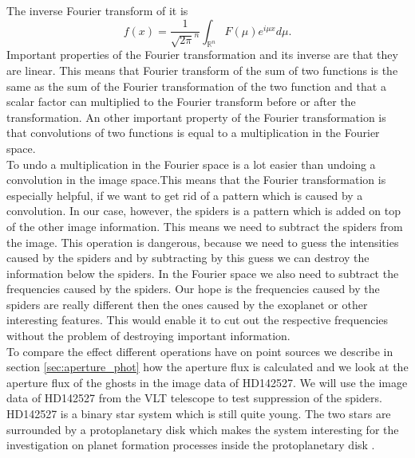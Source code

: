 The inverse Fourier transform of it is
\begin{equation}
	f(x) = \frac{1}{\sqrt{2\pi}^n} \int_{\mathbb{R}^n} F(\mu) e^{i\mu x} d\mu.
\end{equation}
Important properties of the Fourier transformation and its inverse are that they are linear. This means that Fourier transform of the sum of two functions is the same as the sum of the Fourier transformation of the two function and that a scalar factor can multiplied to the Fourier transform before or after the transformation. An other important property of the Fourier transformation is that convolutions of two functions is equal to a multiplication in the Fourier space. \\
To undo a multiplication in the Fourier space is a lot easier than undoing a convolution in the image space.This means that the Fourier transformation is especially helpful, if we want to get rid of a pattern which is caused by a convolution. In our case, however, the spiders is a pattern which is added on top of the other image information. This means we need to subtract the spiders from the image. This operation is dangerous, because we need to guess the intensities caused by the spiders and by subtracting by this guess we can destroy the information below the spiders. In the Fourier space we also need to subtract the frequencies caused by the spiders. Our hope is the frequencies caused by the spiders are really different then the ones caused by the exoplanet or other interesting features. This would enable it to cut out the respective frequencies without the problem of destroying important information.\\
To compare the effect different operations have on point sources we describe in section \ref{sec:aperture_phot} how the aperture flux is calculated and we look at the aperture flux of the ghosts in the image data of HD142527. We will use the image data of HD142527 from the VLT telescope to test suppression of the spiders. HD142527 is a binary star system which is still quite young. The two stars are surrounded by a protoplanetary disk which makes the system interesting for the investigation on planet formation processes inside the protoplanetary disk \cite{HD142527}.\\
